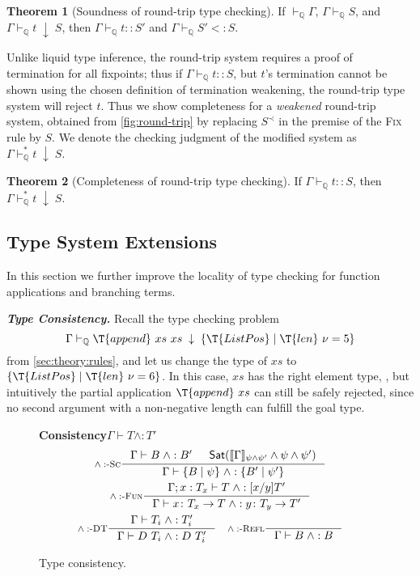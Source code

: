 \documentclass[10pt,preprint]{sigplanconf-pldi16}
\theoremstyle{definition}
\newtheorem{theorem}{Theorem}
\newcommand{\custompar}[1]{\parskip 0pt \textbf{\textit{#1}}}
\renewcommand{\And}{\wedge}
\newcommand{\Subt}{<:}
\newcommand{\Consi}{\mathrel{\mathrm{\wedge:}}}
\newcommand{\App}[2]{{#1}\ {#2}}
\newcommand{\env}{\Gamma}
\newcommand{\consume}{\;\downarrow\;}
\newcommand{\funT}[3]{{#1}\colon {#2} \to {#3}}
\newcommand{\before}{\prec}
\newcommand{\quals}{\mathbb{Q}}
\newcommand{\entailsQ}{\vdash_{\quals}}
\begin{document}
\begin{theorem}[Soundness of round-trip type checking]
If $\entailsQ \env$, $\env\entailsQ S$,
and $\env \entailsQ t \consume S$, then $\env\entailsQ t :: S'$ and $\env \entailsQ S'\Subt S$.
\end{theorem}

Unlike liquid type inference, the round-trip system requires a proof of termination for all fixpoints;
thus if $\env\entailsQ t :: S$,
but $t$'s termination cannot be shown using the chosen definition of termination weakening,
the round-trip type system will reject $t$.
Thus we show completeness for a \emph{weakened} round-trip system,
obtained from \autoref{fig:round-trip} by replacing $S^{\before}$ in the premise of the \textsc{Fix} rule by $S$.
We denote the checking judgment of the modified system as $\env \entailsQ^* t \consume S$.

\begin{theorem}[Completeness of round-trip type checking]
If $\env\entailsQ t :: S$, then $\env \entailsQ^* t \consume S$.
\end{theorem}


\subsection{Type System Extensions}\label{sec:theory:extensions}

In this section we further improve the locality of type checking for
function applications and branching terms.

\custompar{Type Consistency.}
Recall the type checking problem 
$$
\env\entailsQ \App{\App{\T{append}}{xs}}{xs} \consume \{\T{List Pos}\mid \App{\T{len}}{\nu} = 5\}
$$
from \autoref{sec:theory:rules}, and let us change the type of $xs$ to $\{\T{List Pos}\mid \App{\T{len}}{\nu} = 6\}$.
In this case, $xs$ has the right element type, ,
but intuitively the partial application $\App{\T{append}}{xs}$ can still be safely rejected,
since no second argument with a non-negative length can fulfill the goal type.

\begin{figure}
\small
\textbf{Consistency}\quad$\boxed{\env \vdash T\Consi T'}$
\begin{gather*}
\inference[\textsc{$\Consi$-Sc}]
{\env \vdash B\Consi B' & \mathsf{Sat}(\llbracket\Gamma\rrbracket_{\psi \And \psi'}\And\psi\And\psi')}
{\env \vdash \{B\mid \psi\} \Consi \{B'\mid \psi'\} }
\\
\inference[\textsc{$\Consi$-Fun}]
{\env;x: T_x \vdash T\Consi [x/y]T'}
{\env \vdash \funT{x}{T_x}{T} \Consi \funT{y}{T_y}{T'} }
\\
\inference[\textsc{$\Consi$-DT}]
{\env\vdash T_i \Consi T'_i}
{\env \vdash D\ T_i \Consi D\ T'_i}
\quad
\inference[\textsc{$\Consi$-Refl}]
{}
{\env \vdash B \Consi B}
\end{gather*}
\caption{Type consistency.}\label{fig:consistency}
\end{figure}
\end{document}

